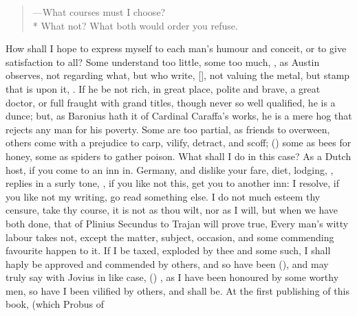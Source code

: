 {\begin{verse}
---What courses must I choose?\\*
What not? What both would order you refuse.
\end{verse}

How shall I hope to express myself to each man's humour and
conceit, or to give satisfaction to all? Some understand too
little, some too much, , as Austin observes, not regarding what, but who
write, [\baselineskip], not valuing the metal,
but stamp that is upon it, . If he
be not rich, in great place, polite and brave, a great doctor, or full
fraught with grand titles, though never so well qualified, he is a
dunce; but, as Baronius hath it of Cardinal Caraffa's works, he is
a mere hog that rejects any man for his poverty. Some are too partial,
as friends to overween, others come with a prejudice to carp, vilify,
detract, and scoff; () some as bees for honey, some as spiders to gather
poison. What shall I do in this case? As a Dutch host, if you come to
an inn in. Germany, and dislike your fare, diet, lodging, \etc, replies
in a surly tone, , if you like not
this, get you to another inn: I resolve, if you like not my writing, go
read something else. I do not much esteem thy censure, take thy course,
it is not as thou wilt, nor as I will, but when we have both done, that
of Plinius Secundus to Trajan will prove true, Every man's witty
labour takes not, except the matter, subject, occasion, and some
commending favourite happen to it. If I be taxed, exploded by thee and
some such, I shall haply be approved and commended by others, and so
have been (), and may truly say with Jovius in like
case, () , as I have been
honoured by some worthy men, so have I been vilified by others, and
shall be. At the first publishing of this book, (which Probus of
}
